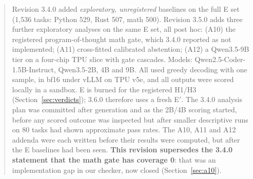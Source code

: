 \documentclass[11pt,a4paper]{article}
\begin{document}
\begin{abstract}
Revision 3.4.0 added \emph{exploratory, unregistered} baselines on the full E set (1,536 tasks:
Python 529, Rust 507, math 500). Revision 3.5.0 adds three further exploratory analyses on the same
E set, all post hoc: (A10) the registered program-of-thought math gate, which 3.4.0 reported as not
implemented; (A11) cross-fitted calibrated abstention; (A12) a Qwen3.5-9B tier on a four-chip TPU
slice with gate cascades. Models: Qwen2.5-Coder-1.5B-Instruct, Qwen3.5-2B, 4B and 9B. All used
greedy decoding with one sample, in bf16 under vLLM on TPU v5e, and all outputs were scored locally
in a sandbox. E is burned for the registered H1/H3 (Section~\ref{sec:verdicts}); 3.6.0 therefore uses a fresh E$'$. The 3.4.0 analysis
plan was committed after generation and as the 2B/4B scoring started, before any scored outcome was
inspected but after smaller descriptive runs on 80 tasks had shown approximate pass rates. The A10,
A11 and A12 addenda were each written before their results were computed, but after the E baselines
had been seen. \textbf{This revision supersedes the 3.4.0 statement that the math gate has coverage
0}: that was an implementation gap in our checker, now closed (Section~\ref{sec:a10}).


\end{abstract}
\end{document}
